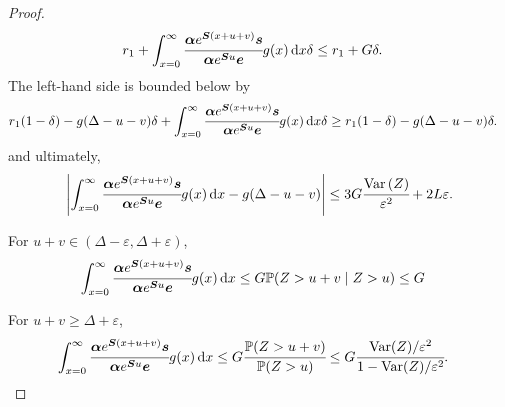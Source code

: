 \begin{proof}
\begin{align*}
		r _1+\int_{x=0}^\infty \cfrac{\boldsymbol \alpha  e^{\boldsymbol{S} (x+u+v)} \boldsymbol s}{\boldsymbol \alpha  e^{\boldsymbol{S} u} \boldsymbol e} g(x)\, \mathrm{d} x\delta 
		&\leq r _1 + G \delta .
	\end{align*}
	The left-hand side is bounded below by 
	\begin{align*}
		r_1 (1-\delta ) - g(\Delta-u-v)\delta +\int_{x=0}^\infty \cfrac{\boldsymbol \alpha  e^{\boldsymbol{S} (x+u+v)} \boldsymbol s}{\boldsymbol \alpha  e^{\boldsymbol{S} u} \boldsymbol e} g(x)\, \mathrm{d} x\delta 
		&\geq r _1(1-\delta ) - g(\Delta-u-v)\delta .
	\end{align*}
	and ultimately, 
	\begin{align}
		\left|\int_{x=0}^\infty \cfrac{\boldsymbol \alpha  e^{\boldsymbol{S} (x+u+v)} \boldsymbol s}{\boldsymbol \alpha  e^{\boldsymbol{S} u} \boldsymbol e} g(x)\, \mathrm{d} x -g(\Delta-u-v)\right| \leq 3G\cfrac{\mathrm{Var} \left(Z \right)}{\varepsilon^2} + 2L\varepsilon .
	\end{align}
	
	For \(u+v\in (\Delta-\varepsilon, \Delta + \varepsilon)\),
	\begin{align}
		\int_{x=0}^\infty \cfrac{\boldsymbol \alpha  e^{\boldsymbol{S} (x+u+v)} \boldsymbol s}{\boldsymbol \alpha  e^{\boldsymbol{S} u} \boldsymbol e} g(x)\, \mathrm{d} x & \leq G \mathbb P(Z>u+v\mid Z>u) \leq G
	\end{align}
	
	For \(u+v \geq \Delta + \varepsilon\),
	\begin{align}
		\int_{x=0}^\infty \cfrac{\boldsymbol \alpha  e^{\boldsymbol{S} (x+u+v)} \boldsymbol s}{\boldsymbol \alpha  e^{\boldsymbol{S} u} \boldsymbol e} g(x)\, \mathrm{d} x & \leq G \cfrac{\mathbb P(Z>u+v)}{\mathbb P( Z>u)} 
		 \leq G\cfrac{\mathrm{Var}(Z)/\varepsilon^2}{1-\mathrm{Var}(Z)/\varepsilon^2} .
	\end{align}
\end{proof}

